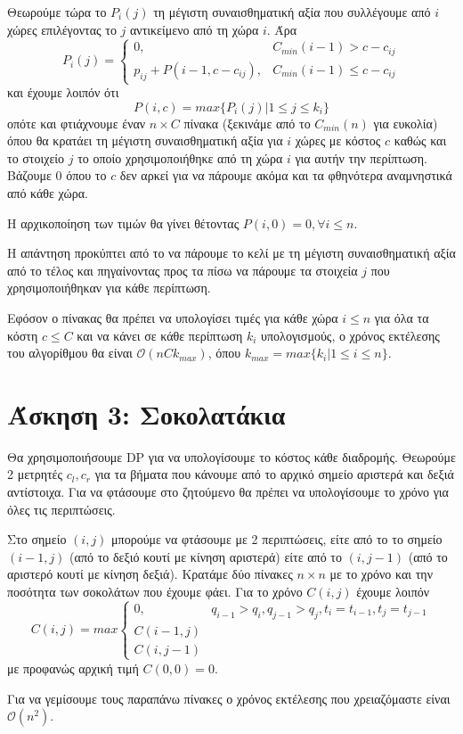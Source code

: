 \documentclass[a4paper,11pt]{article}
\begin{document}
Θεωρούμε τώρα το $P_i(j)$ τη μέγιστη συναισθηματική αξία που συλλέγουμε από $i$ χώρες επιλέγοντας το $j$ αντικείμενο από τη χώρα $i$. Άρα
$$P_i(j) =
  \begin{cases}
    0, & \text{$C_{min}(i-1) > c-c_{ij}$}\\
    p_{ij} + P(i-1,c-c_{ij}), & \text{$C_{min}(i-1) \leq c-c_{ij}$}
  \end{cases}$$
και έχουμε λοιπόν ότι
$$P(i,c) = max\{P_i(j) | 1 \leq j \leq k_i\}$$
οπότε και φτιάχνουμε έναν $n \times C$ πίνακα (ξεκινάμε από το $C_{min}(n)$ για ευκολία) όπου θα κρατάει τη μέγιστη συναισθηματική αξία για $i$ χώρες με κόστος $c$ καθώς και το στοιχείο $j$ το οποίο χρησιμοποιήθηκε από τη χώρα $i$ για αυτήν την περίπτωση. Βάζουμε 0 όπου το $c$ δεν αρκεί για να πάρουμε ακόμα και τα φθηνότερα αναμνηστικά από κάθε χώρα.

Η αρχικοποίηση των τιμών θα γίνει θέτοντας $P(i,0) = 0, \forall i \leq n$.

Η απάντηση προκύπτει από το να πάρουμε το κελί με τη μέγιστη συναισθηματική αξία από το τέλος και πηγαίνοντας προς τα πίσω να πάρουμε τα στοιχεία $j$ που χρησιμοποιήθηκαν για κάθε περίπτωση.

Εφόσον ο πίνακας θα πρέπει να υπολογίσει τιμές για κάθε χώρα $i \leq n$ για όλα τα κόστη $c \leq C$ και να κάνει σε κάθε περίπτωση $k_i$ υπολογισμούς, ο χρόνος εκτέλεσης του αλγορίθμου θα είναι $\mathcal{O}(nCk_{max})$, όπου $k_{max} = max\{k_i | 1 \leq i \leq n\}$.

\section*{Άσκηση 3: Σοκολατάκια}
Θα χρησιμοποιήσουμε DP για να υπολογίσουμε το κόστος κάθε διαδρομής. Θεωρούμε 2 μετρητές $c_l, c_r$ για τα βήματα που κάνουμε από το αρχικό σημείο αριστερά και δεξιά αντίστοιχα. Για να φτάσουμε στο ζητούμενο θα πρέπει να υπολογίσουμε το χρόνο για όλες τις περιπτώσεις.

Στο σημείο $(i, j)$ μπορούμε να φτάσουμε με 2 περιπτώσεις, είτε από το το σημείο $(i-1, j)$ (από το δεξιό κουτί με κίνηση αριστερά) είτε από το $(i, j-1)$ (από το αριστερό κουτί με κίνηση δεξιά). Κρατάμε δύο πίνακες $n \times n$ με το χρόνο και την ποσότητα των σοκολάτων που έχουμε φάει. Για το χρόνο $C(i, j)$ έχουμε λοιπόν
$$C(i, j) = max
  \begin{cases}
    0, & \text{$q_{i-1} > q_i, q_{j-1} > q_j, t_i = t_{i-1}, t_j = t_{j-1}$}\\
    C(i-1, j)\\
    C(i, j-1)
  \end{cases}$$
με προφανώς αρχική τιμή $C(0,0) = 0$.

Για να γεμίσουμε τους παραπάνω πίνακες ο χρόνος εκτέλεσης που χρειαζόμαστε είναι $\mathcal{O}(n^2)$.
  
\end{document}
